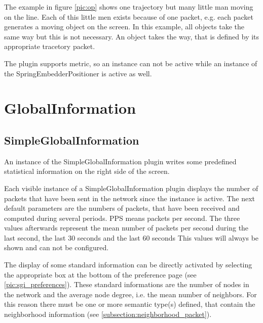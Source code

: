 The example in figure \ref{pic:op} shows one trajectory but many little man moving on the line. Each of this
little men exists because of one packet, e.g. each packet generates a moving object on the screen. In this
example, all objects take the same way but this is not necessary. An object takes the way, that is defined
by its appropriate tracetory packet.

The plugin supports metric, so an instance can not be active while an instance of the SpringEmbedderPositioner is
active as well.

\newpage
\section{GlobalInformation}

\subsection{SimpleGlobalInformation}
\label{subsection:simpleglobalinformation}

An instance of the SimpleGlobalInformation plugin writes some predefined statistical information on the right
side of the screen.

Each visible instance of a SimpleGlobalInformation plugin displays the number of packets that have been sent
in the network since the instance is active. The next default parameters are the numbers of packets, that have been
received and computed during several periods. PPS means packets per second. The three values afterwards
represent the mean number of packets per second during the last second, the last 30 seconds and the last 60 seconds
This values will always be shown and can not be configured.

The display of some standard information can be directly activated by selecting the appropriate box at the bottom
of the preference page (see \ref{pic:sgi_preferences}). These standard informations are the number of nodes in the
network and the average node degree, i.e. the mean number of neighbors. For this reason there must be one or more semantic
type(s) defined, that contain the neighborhood information (see \ref{subsection:neighborhood_packet}).

